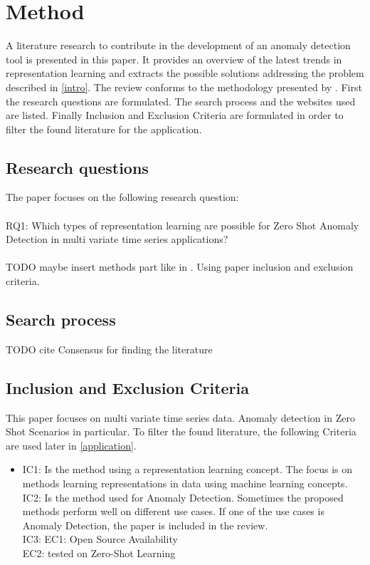 \section{Method}\label{method}
A literature research to contribute in the development of an anomaly detection tool is presented in this paper. It provides an overview of the latest trends in representation learning and extracts the possible solutions addressing the problem described in \ref{intro}. The review conforms to the methodology presented by . First the research questions are formulated. The search process and the websites used are listed. Finally Inclusion and Exclusion Criteria are formulated in order to filter the found literature for the application.
\subsection{Research questions}
The paper focuses on the following research question:\\\\
RQ1: Which types of representation learning are possible for Zero Shot Anomaly Detection in multi variate time series applications?\\\\
TODO maybe insert methods part like in \cite{su_large_2024}. Using paper inclusion and exclusion criteria.
\subsection{Search process}
TODO cite Consensus for finding the literature
\subsection{Inclusion and Exclusion Criteria}
This paper focuses on multi variate time series data. Anomaly detection in Zero Shot Scenarios in particular. To filter the found literature, the following Criteria are used later in \ref{application}.


\label{tab_criteria}
\begin{itemize}
\item IC1: Is the method using a representation learning concept. The focus is on methods learning representations in data using machine learning concepts.\\
IC2: Is the method used for Anomaly Detection. Sometimes the proposed methods perform well on different use cases. If one of the use cases is Anomaly Detection, the paper is included in the review.\\
IC3:
EC1: Open Source Availability \\
EC2: tested on Zero-Shot Learning
\end{itemize}
